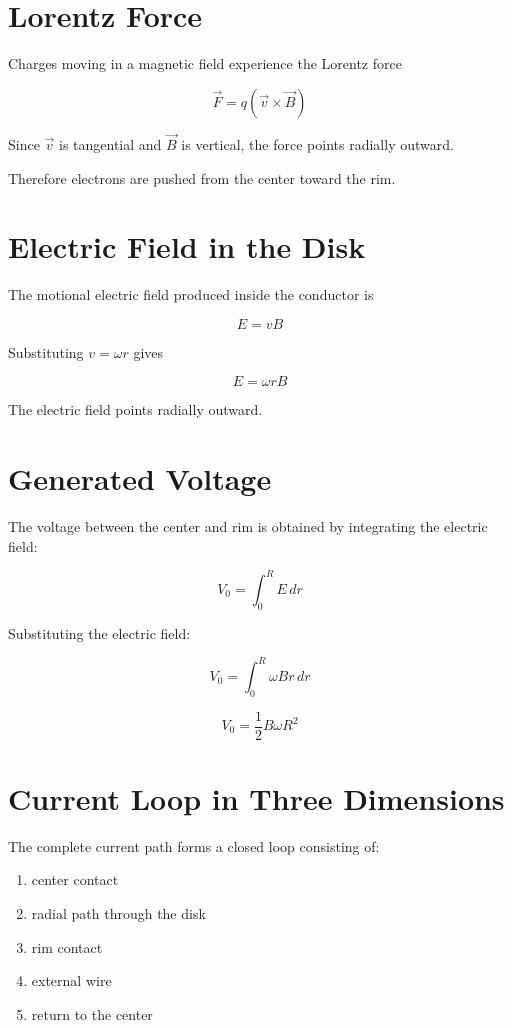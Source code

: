 \documentclass[12pt, a4paper]{article}
\begin{document}
\section{Lorentz Force}

Charges moving in a magnetic field experience the Lorentz force

\[
\vec{F} = q(\vec{v} \times \vec{B})
\]

Since $\vec{v}$ is tangential and $\vec{B}$ is vertical, the force points
radially outward.

Therefore electrons are pushed from the center toward the rim.

\section{Electric Field in the Disk}

The motional electric field produced inside the conductor is

\[
E = vB
\]

Substituting $v=\omega r$ gives

\[
E = \omega r B
\]

The electric field points radially outward.

\section{Generated Voltage}

The voltage between the center and rim is obtained by integrating the electric field:

\[
V_0 = \int_0^R E\,dr
\]

Substituting the electric field:

\[
V_0 = \int_0^R \omega B r \, dr
\]

\[
V_0 = \frac{1}{2} B \omega R^2
\]

\section{Current Loop in Three Dimensions}

The complete current path forms a closed loop consisting of:

\begin{enumerate}
\item center contact
\item radial path through the disk
\item rim contact
\item external wire
\item return to the center
\end{enumerate}
\end{document}
